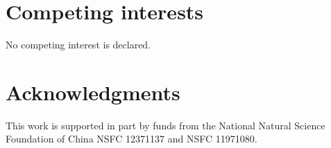 \documentclass[preprint,12pt]{elsarticle}
\begin{document}
\section{Competing interests}
No competing interest is declared.

\section{Acknowledgments}
This work is supported in part by funds from the National Natural Science Foundation of China NSFC 12371137 and NSFC 11971080.



\end{document}
